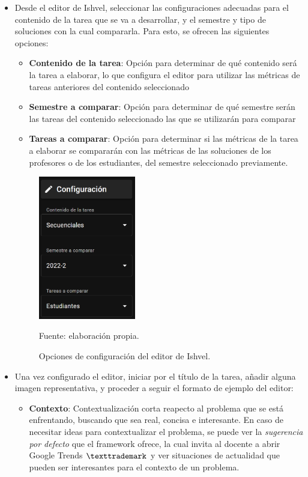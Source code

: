 \documentclass[letterpaper,12pt]{article}
\begin{document}
\begin{itemize}
  \item Desde el editor de Ishvel, seleccionar las configuraciones adecuadas para el contenido de la tarea que se va a desarrollar, y el semestre y tipo de soluciones con la cual compararla. Para esto, se ofrecen las siguientes opciones:
        \begin{itemize}
          \item \textbf{Contenido de la tarea}: Opción para determinar de qué contenido será la tarea a elaborar, lo que configura el editor para utilizar las métricas de tareas anteriores del contenido seleccionado
          \item \textbf{Semestre a comparar}: Opción para determinar de qué semestre serán las tareas del contenido seleccionado las que se utilizarán para comparar
          \item \textbf{Tareas a comparar}: Opción para determinar si las métricas de la tarea a elaborar se compararán con las métricas de las soluciones de los profesores o de los estudiantes, del semestre seleccionado previamente.
        \end{itemize}
        \begin{figure}[H]
          \centering
          \includegraphics[width=0.4\textwidth]{figures/ishvel1.png}
          \caption{Opciones de configuración del editor de Ishvel.} Fuente: elaboración propia.
          \label{img:ishvel1}
        \end{figure}
  \item Una vez configurado el editor, iniciar por el título de la tarea, añadir alguna imagen representativa, y proceder a seguir el formato de ejemplo del editor:
        \begin{itemize}
          \item \textbf{Contexto}: Contextualización corta reapecto al problema que se está enfrentando, buscando que sea real, concisa e interesante. En caso de necesitar ideas para contextualizar el problema, se puede ver la \textit{sugerencia por defecto} que el framework ofrece, la cual invita al docente a abrir Google Trends $\texttrademark$ y ver situaciones de actualidad que pueden ser interesantes para el contexto de un problema.

\end{itemize}
\end{itemize}
\end{document}
